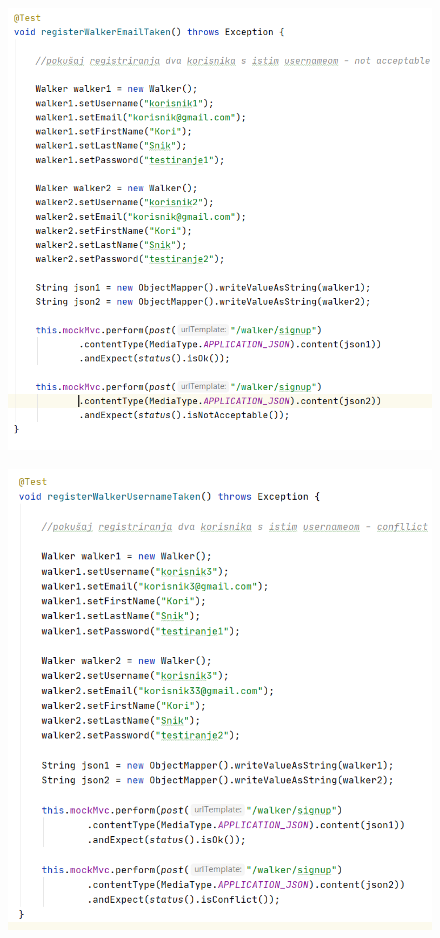  			\begin{figure}[H]
 				\centerline{
 					\includegraphics[scale=0.75]{slike/walker1.PNG}}
 				\centering
 			\end{figure}
 		
 		
 		
 			\begin{figure}[H]
 				\centerline{
 				\includegraphics[scale=0.75]{slike/walker2.PNG}} %
 				\centering
 			\end{figure}
 		
